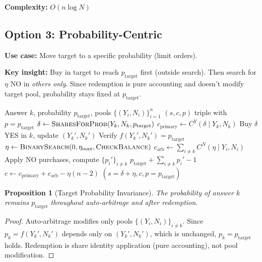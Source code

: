 \documentclass[11pt]{article}
\newtheorem{proposition}[theorem]{Proposition}
\begin{document}
\textbf{Complexity:} $O(n \log N)$

\subsection{Option 3: Probability-Centric}

\textbf{Use case:} Move target to a specific probability (limit orders).

\textbf{Key insight:} Buy in target to reach $p_{\text{target}}$ first (outside search). Then search for $\eta$ NO in \emph{others only}. Since redemption is pure accounting and doesn't modify target pool, probability stays fixed at $p_{\text{target}}$.

\begin{algorithm}[H]
\caption{Probability-Centric Purchase}
\label{alg:prob-centric}
\begin{algorithmic}[1]
\Require Answer $k$, probability $p_{\text{target}}$, pools $\{(Y_i, N_i)\}_{i=1}^n$
\Ensure $(s, c, p)$ triple with $p = p_{\text{target}}$
\State $\delta \gets \textsc{SharesForProb}(Y_k, N_k, p_{\text{target}})$ 
\State $c_{\text{primary}} \gets C^Y(\delta \mid Y_k, N_k)$
\State Buy $\delta$ YES in $k$, update $(Y_k', N_k')$
\State Verify $f(Y_k', N_k') = p_{\text{target}}$
\State
\State $\eta \gets \textsc{BinarySearch}(0, \eta_{\max}, \textsc{CheckBalance})$
    \State $c_{\text{arb}} \gets \sum_{i \neq k} C^N(\eta \mid Y_i, N_i)$ 
    \State Apply NO purchases, compute $\{p_i'\}_{i \neq k}$
    \State \Return $p_{\text{target}} + \sum_{i \neq k} p_i' - 1$ 
\EndFunction
\State $c \gets c_{\text{primary}} + c_{\text{arb}} - \eta(n-2)$ 
\State \Return $(s = \delta + \eta, c, p = p_{\text{target}})$
\end{algorithmic}
\end{algorithm}

\begin{proposition}[Target Probability Invariance]
The probability of answer $k$ remains $p_{\text{target}}$ throughout auto-arbitrage and after redemption.
\end{proposition}

\begin{proof}
Auto-arbitrage modifies only pools $\{(Y_i, N_i)\}_{i \neq k}$. Since $p_k = f(Y_k', N_k')$ depends only on $(Y_k', N_k')$, which is unchanged, $p_k = p_{\text{target}}$ holds. Redemption is share identity application (pure accounting), not pool modification.
\end{proof}
\end{document}
